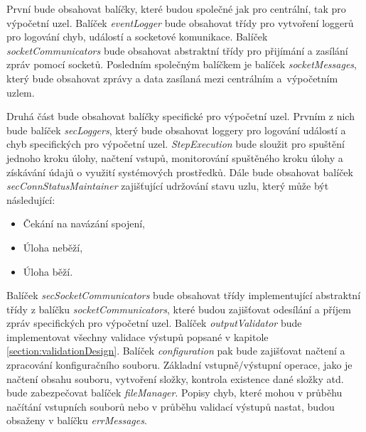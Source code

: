 První bude obsahovat balíčky, které budou společné jak pro centrální, tak pro výpočetní uzel. Balíček \textit{eventLogger} bude obsahovat třídy pro vytvoření loggerů pro logování chyb, událostí a socketové komunikace. Balíček \textit{socketCommunicators} bude obsahovat abstraktní třídy pro přijímání a zasílání zpráv pomocí socketů. Posledním společným balíčkem je balíček \textit{socketMessages}, který bude obsahovat zprávy a data zasílaná mezi centrálním a~výpočetním uzlem.

Druhá část bude obsahovat balíčky specifické pro výpočetní uzel. Prvním z nich bude balíček \textit{secLoggers}, který bude obsahovat loggery pro logování událostí a chyb specifických pro výpočetní uzel. \textit{StepExecution} bude sloužit pro spuštění jednoho kroku úlohy, načtení vstupů, monitorování spuštěného kroku úlohy a získávání údajů o využití systémových prostředků. Dále bude obsahovat balíček \textit{secConnStatusMaintainer} zajišťující udržování stavu uzlu, který může být následující:

\begin{itemize}
    \item Čekání na navázání spojení,
    \item Úloha neběží,
    \item Úloha běží.
\end{itemize}

Balíček \textit{secSocketCommunicators} bude obsahovat třídy implementující abstraktní třídy z balíčku \textit{socketCommunicators}, které budou zajišťovat odesílání a příjem zpráv specifických pro výpočetní uzel. Balíček \textit{outputValidator} bude implementovat všechny validace výstupů popsané v kapitole \ref{section:validationDesign}. Balíček \textit{configuration} pak bude zajišťovat načtení a zpracování konfiguračního souboru. Základní vstupně/výstupní operace, jako je načtení obsahu souboru, vytvoření složky, kontrola existence dané složky atd. bude zabezpečovat balíček \textit{fileManager}. Popisy chyb, které mohou v průběhu načítání vstupních souborů nebo v průběhu validací výstupů nastat, budou obsaženy v balíčku \textit{errMessages}.

